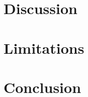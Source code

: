 \documentclass[11pt]{article}
\begin{document}
\section{Discussion}

\section{Limitations}

\section{Conclusion}



\end{document}
